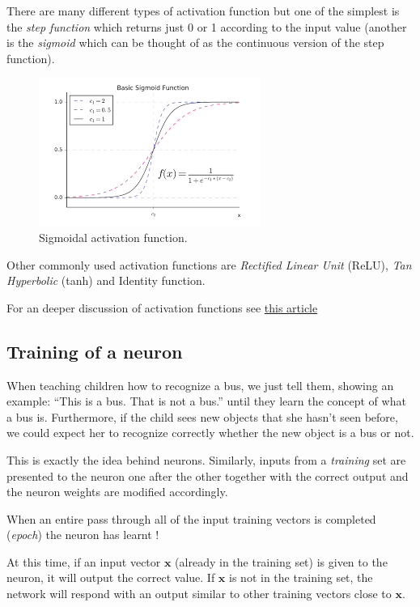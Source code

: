 There are many different types of activation function but one of the
simplest is the \emph{step function} which returns just 0 or 1 according
to the input value (another is the \emph{sigmoid} which can be thought
of as the continuous version of the step function).

\begin{figure}[htb]
	\centering
	\includegraphics{figures/sigmoid.png}
	\caption{Sigmoidal activation function.}
\end{figure}

Other commonly used activation functions are \emph{Rectified Linear Unit}
(ReLU), \emph{Tan Hyperbolic} (tanh) and Identity function.

For an deeper discussion of activation functions see
\href{https://medium.com/the-theory-of-everything/understanding-activation-functions-in-neural-networks-9491262884e0}{this article}

\subsection{Training of a neuron}\label{training-of-a-neuron}

When teaching children how to recognize a bus, we just tell them,
showing an example: ``This is a bus. That is not a bus.'' until they
learn the concept of what a bus is. Furthermore, if the child sees new
objects that she hasn't seen before, we could expect her to recognize
correctly whether the new object is a bus or not.

This is exactly the idea behind neurons. Similarly, inputs from a
\emph{training} set are presented to the neuron one after the other
together with the correct output and the neuron weights are modified
accordingly.

When an entire pass through all of the input training vectors is
completed (\emph{epoch}) the neuron has learnt !

At this time, if an input vector \(\mathbf{x}\) (already in the training
set) is given to the neuron, it will output the correct value. If
\(\mathbf{x}\) is not in the training set, the network will respond with
an output similar to other training vectors close to \(\mathbf{x}\).

